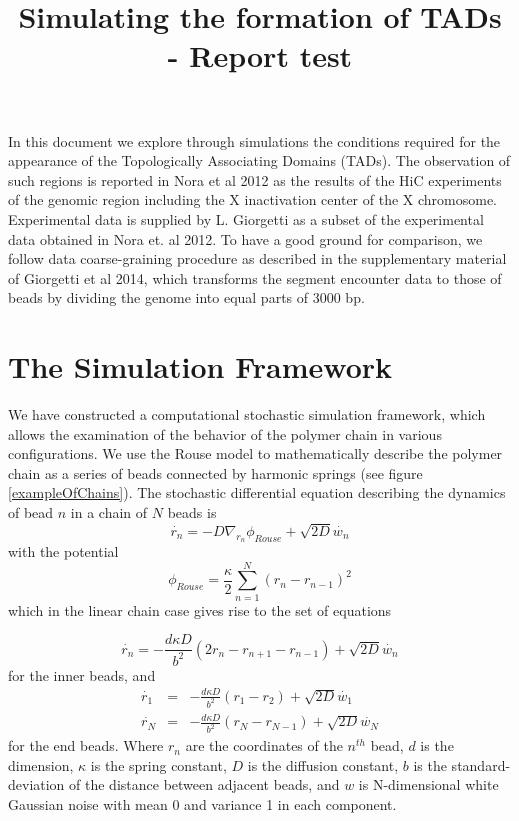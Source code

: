 \documentclass[12pt]{paper}
\begin{document}
\title{Simulating the formation of TADs - Report test}
\maketitle
In this document we explore through simulations the conditions required for the appearance of the Topologically Associating Domains (TADs). The observation of such regions is reported in Nora et al 2012 as the results of the HiC experiments of the genomic region including the X inactivation center of the X chromosome. Experimental data is supplied by L. Giorgetti as a subset of the experimental data obtained in Nora et. al 2012. To have a good ground for comparison, we follow data coarse-graining procedure as described in the supplementary material of Giorgetti et al 2014, which transforms the segment encounter data to those of beads by dividing the genome into equal parts of 3000 bp.   



\tableofcontents
  
\section{The Simulation Framework}
We have constructed a computational stochastic simulation framework, which allows the examination of the behavior of the polymer chain in various configurations.
We use the Rouse model to mathematically describe the polymer chain as a series of beads connected by harmonic springs (see figure \ref{exampleOfChains}). The stochastic differential equation describing the dynamics of bead $n$ in a chain of $N$ beads is 
\begin{equation*}
\dot{r_n} = -D\nabla_{r_n}\phi_{Rouse}+\sqrt{2D}\dot{w_n}
\end{equation*}
with the potential 
\begin{equation*}
\phi_{Rouse}=\frac{\kappa}{2}\sum_{n=1}^N \left(r_n-r_{n-1}\right)^2
\end{equation*}
 which in the linear chain case gives rise to the set of equations

\begin{equation*}
\dot{r_n}= -\frac{d\kappa D}{b^2}\left(2r_n-r_{n+1}-r_{n-1}\right)+\sqrt{2D}\dot{w_n}
\end{equation*}
for the inner beads, and 
\begin{eqnarray*}
\dot{r_1} &=& -\frac{d\kappa D}{b^2}\left(r_1-r_{2}\right)+\sqrt{2D}\dot{w_1}\\
\dot{r_N} &=& -\frac{d\kappa D}{b^2}\left(r_N-r_{N-1}\right)+\sqrt{2D}\dot{w_N}
\end{eqnarray*} 
for the end beads. Where $r_n$ are the coordinates of the $n^{th}$ bead, $d$ is the dimension, $\kappa$ is the spring constant, $D$ is the diffusion constant, $b$ is the standard-deviation of the distance between adjacent beads, and $w$ is N-dimensional white Gaussian noise with mean 0 and variance 1 in each component. 
\end{document}
